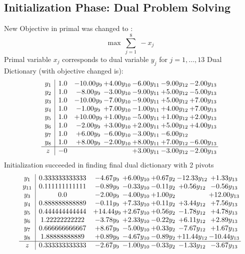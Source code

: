\documentclass[9pt]{article}
\begin{document}
\subsection{Initialization Phase: Dual Problem Solving}
New Objective in primal was changed to : \[ \max\ \sum_{j=1}^{8}\ - x_j \] 
Primal variable $x_j$ corresponds to dual variable $y_j$ for $j = 1,\ldots,13$
Dual Dictionary (with objective changed is): 
\[\begin{array}{c| c c@{\hskip 2pt} c@{\hskip 2pt} c@{\hskip 2pt} c@{\hskip 2pt} c@{\hskip 2pt} }
 y_{1}   &  1.0 & -10.00 y_{9} & +  4.00 y_{10} & -6.00 y_{11} & -9.00 y_{12} & -2.00 y_{13}\\
 y_{2}   &  1.0 & -8.00 y_{9} & -3.00 y_{10} & -9.00 y_{11} & +  5.00 y_{12} & -5.00 y_{13}\\
 y_{3}   &  1.0 & -10.00 y_{9} & -7.00 y_{10} & -9.00 y_{11} & +  5.00 y_{12} & +  7.00 y_{13}\\
 y_{4}   &  1.0 & -1.00 y_{9} & +  7.00 y_{10} & -1.00 y_{11} & +  4.00 y_{12} & +  7.00 y_{13}\\
 y_{5}   &  1.0 & + 10.00 y_{9} & +  1.00 y_{10} & -5.00 y_{11} & +  1.00 y_{12} & +  2.00 y_{13}\\
 y_{6}   &  1.0 & -2.00 y_{9} & +  3.00 y_{10} & +  2.00 y_{11} & +  5.00 y_{12} & +  4.00 y_{13}\\
 y_{7}   &  1.0 & +  6.00 y_{9} & -6.00 y_{10} & -3.00 y_{11} & -6.00 y_{12} &   \\
 y_{8}   &  1.0 & +  8.00 y_{9} & -2.00 y_{10} & +  8.00 y_{11} & +  7.00 y_{12} & -6.00 y_{13}\\
\hline
z    &  -0  &    &   & +  3.00 y_{11} & -3.00 y_{12} & -2.00 y_{13}\\
\end{array}\]
Initialization succeeded in finding final dual dictionary with 2 pivots
\[\begin{array}{c| c c@{\hskip 2pt} c@{\hskip 2pt} c@{\hskip 2pt} c@{\hskip 2pt} c@{\hskip 2pt} }
 y_{1}   &  0.333333333333 & -4.67 y_{9} & +  6.00 y_{10} & +  0.67 y_{2} & -12.33 y_{12} & +  1.33 y_{13}\\
 y_{11}   &  0.111111111111 & -0.89 y_{9} & -0.33 y_{10} & -0.11 y_{2} & +  0.56 y_{12} & -0.56 y_{13}\\
 y_{3}   &  0.0 & -2.00 y_{9} & -4.00 y_{10} & +  1.00 y_{2} &   & + 12.00 y_{13}\\
 y_{4}   &  0.888888888889 & -0.11 y_{9} & +  7.33 y_{10} & +  0.11 y_{2} & +  3.44 y_{12} & +  7.56 y_{13}\\
 y_{5}   &  0.444444444444 & + 14.44 y_{9} & +  2.67 y_{10} & +  0.56 y_{2} & -1.78 y_{12} & +  4.78 y_{13}\\
 y_{6}   &  1.22222222222 & -3.78 y_{9} & +  2.33 y_{10} & -0.22 y_{2} & +  6.11 y_{12} & +  2.89 y_{13}\\
 y_{7}   &  0.666666666667 & +  8.67 y_{9} & -5.00 y_{10} & +  0.33 y_{2} & -7.67 y_{12} & +  1.67 y_{13}\\
 y_{8}   &  1.88888888889 & +  0.89 y_{9} & -4.67 y_{10} & -0.89 y_{2} & + 11.44 y_{12} & -10.44 y_{13}\\
\hline
z    &  0.333333333333 & -2.67 y_{9} & -1.00 y_{10} & -0.33 y_{2} & -1.33 y_{12} & -3.67 y_{13}\\
\end{array}\]
\end{document}
